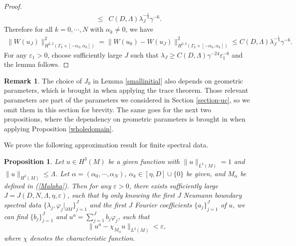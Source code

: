 \documentclass[11pt,letterpaper]{amsart}
\numberwithin{equation}{section}
\theoremstyle{definition}
\theoremstyle{plain}
\theoremstyle{definition}
\theoremstyle{plain}
\newtheorem{projection}[u0]{Proposition}
\theoremstyle{definition}
\newtheorem{remark}[remark0]{Remark}
\theoremstyle{plain}
\begin{document}
\begin{proof}
\begin{eqnarray*}
&\leqslant& C(D,\Lambda)\lambda_{J}^{-\frac{1}{4}}\gamma^{-6}.
\end{eqnarray*}
Therefore for all $k=0,\cdots,N$ with $\alpha_k\neq 0$, we have
\begin{eqnarray*}
\|W(u_J)\|^2_{H^{2,2}(\Gamma_k\times [-\alpha_k,\alpha_k])} = \|W(u_0)-W(u_J)\|^2_{H^{2,2}(\Gamma_k\times [-\alpha_k,\alpha_k])} \leqslant C(D,\Lambda)\lambda_{J}^{-\frac{1}{4}}\gamma^{-6}.
\end{eqnarray*}
For any $\varepsilon_1>0$, choose sufficiently large $J$ such that $\lambda_{J}\geqslant C(D,\Lambda)\gamma^{-24}\varepsilon_1^{-8}$ and the lemma follows.
\end{proof}

\begin{remark}
The choice of $J_0$ in Lemma \ref{smallinitial} also depends on geometric parameters, which is brought in when applying the trace theorem. Those relevant parameters are part of the parameters we considered in Section \ref{section-uc}, so we omit them in this section for brevity. The same goes for the next two propositions, where the dependency on geometric parameters is brought in when applying Proposition \ref{wholedomain}.
\end{remark}

We prove the following approximation result for finite spectral data.

\begin{projection}\label{projection}
Let $u\in H^3(M)$ be a given function with $\|u\|_{L^2(M)}=1$ and $\|u\|_{H^3(M)}\leqslant \Lambda$. Let $\alpha=(\alpha_0,\cdots,\alpha_N)$, $\alpha_k\in [\eta, D]\cup\{0\}$ be given, and $M_{\alpha}$ be defined in (\ref{Malpha}). Then for any $\varepsilon>0$, there exists sufficiently large $J=J(D,N,\Lambda,\eta,\varepsilon)$, such that by only knowing the first $J$ Neumann boundary spectral data $\{\lambda_j,\varphi_j|_{\partial M}\}_{j=1}^J$ and the first $J$ Fourier coefficients $\{a_j\}_{j=1}^J$ of $u$, we can find $\{b_j\}_{j=1}^{J}$ and $u^a=\sum_{j=1}^{J}b_j \varphi_j$, such that
$$\|u^a-\chi_{M_{\alpha}}u\|_{L^2(M)} <\varepsilon,$$
where $\chi$ denotes the characteristic function.
\end{projection}
\end{document}
